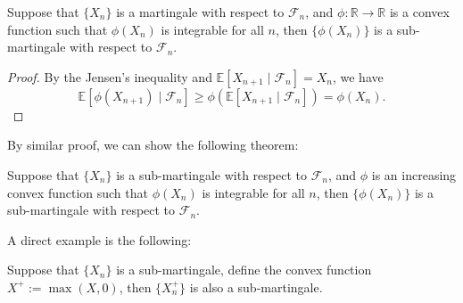 \begin{theorem}
Suppose that $\{X_n\}$ is a martingale with respect to $\mathcal{F}_n$, and
$\phi:\mathbb{R}\to\mathbb{R}$ is a convex function such that $\phi(X_n)$ is integrable for all $n$,
then $\{\phi(X_n)\}$ is a sub-martingale with respect to $\mathcal{F}_n$.
\end{theorem}
\begin{proof}
By the Jensen's inequality and $\mathbb{E}[X_{n+1}\mid\mathcal{F}_n]=X_n$, we have
\[
\mathbb{E}[\phi(X_{n+1})\mid\mathcal{F}_n]\ge 
\phi(\mathbb{E}[X_{n+1}\mid\mathcal{F}_n])=\phi(X_n).
\] 
\end{proof}
By similar proof, we can show the following theorem:
\begin{theorem}
Suppose that $\{X_n\}$ is a sub-martingale with respect to $\mathcal{F}_n$,
and $\phi$ is an increasing convex function such that $\phi(X_n)$ is integrable for all $n$,
then $\{\phi(X_n)\}$ is a sub-martingale with respect to $\mathcal{F}_n$.
\end{theorem}
A direct example is the following:
\begin{example}
Suppose that $\{X_n\}$ is a sub-martingale, define the convex function $X^+:=\max(X,0)$, then
$\{X_n^+\}$ is also a sub-martingale.
\end{example}

